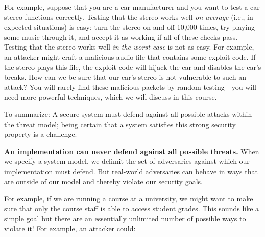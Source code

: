 \documentclass[
  letterpaper,
]{scrbook}
\theoremstyle{definition}
\theoremstyle{plain}
\theoremstyle{plain}
\theoremstyle{remark}
\begin{document}

For example, suppose that you are a car manufacturer and you want to
test a car stereo functions correctly. Testing that the stereo works
well \emph{on average} (i.e., in expected situations) is easy: turn the
stereo on and off 10,000 times, try playing some music through it, and
accept it as working if all of these checks pass. Testing that the
stereo works well \emph{in the worst case} is not as easy. For example,
an attacker might craft a malicious audio file that contains some
exploit code. If the stereo plays this file, the exploit code will
hijack the car and disables the car's breaks. How can we be sure that
our car's stereo is not vulnerable to such an attack? You will rarely
find these malicious packets by random testing---you will need more
powerful techniques, which we will discuss in this course.


To summarize: A secure system must defend against all possible attacks
within the threat model; being certain that a system satisfies this
strong security property is a challenge.

\textbf{An implementation can never defend against all possible
threats.} When we specify a system model, we delimit the set of
adversaries against which our implementation must defend. But real-world
adversaries can behave in ways that are outside of our model and thereby
violate our security goals.

For example, if we are running a course at a university, we might want
to make sure that only the course staff is able to access student
grades. This sounds like a simple goal but there are an essentially
unlimited number of possible ways to violate it! For example, an
attacker could:
\end{document}
